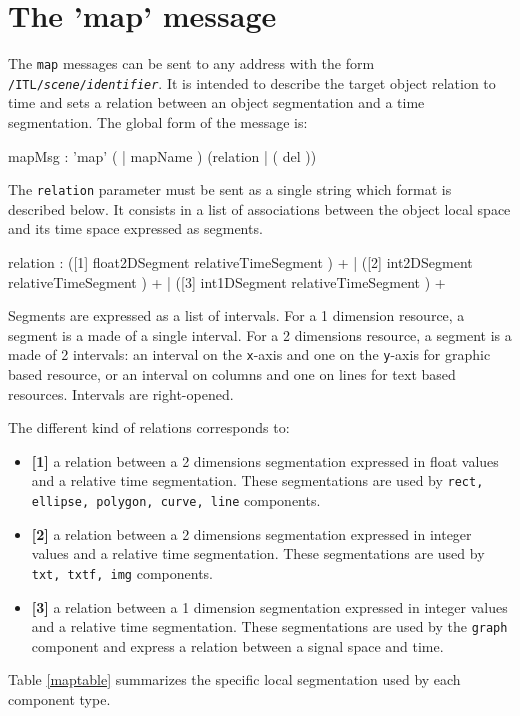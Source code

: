 \documentclass[a4paper,twoside]{report}
\newcommand{\sublevel}[1]	{\section{#1}}
\newcommand{\OSC}[1]		{\texttt{#1}}
\newcommand{\values}[1]	{\texttt{#1}}
\begin{document}
\sublevel{The 'map' message}
\label{mapMsg}

The \OSC{map} messages can be sent to any address with the form \OSC{/ITL/\textit{scene}/\textit{identifier}}. It is intended to describe the target object relation to time and sets a relation between an object segmentation and a time segmentation. 
The global form of the message is:

\begin{rail}
mapMsg : 'map' ( | mapName ) (relation	|	( del ))
\end{rail}

The \OSC{relation} parameter must be sent as a single string which format is described below. It consists in a list of associations between the object local space and its time space expressed as segments.

\begin{rail}
relation : 
		([1] float2DSegment relativeTimeSegment ) +
	| 	([2] int2DSegment relativeTimeSegment ) +
	| 	([3] int1DSegment relativeTimeSegment ) + 
\end{rail}

Segments are expressed as a list of intervals. For a 1 dimension resource, a segment is a made of a single interval. For a 2 dimensions resource, a segment is a made of 2 intervals: an interval on the \values{x}-axis and one on the \values{y}-axis for graphic based resource, or an interval on columns and one on lines for text based resources. Intervals are right-opened.

The different kind of relations corresponds to:
\begin{itemize}
\item \textbf{[1]} a relation between a 2 dimensions segmentation expressed in float values and a relative time segmentation. These segmentations are used by \OSC{rect, ellipse, polygon, curve, line} components.
\item \textbf{[2]} a relation between a 2 dimensions segmentation expressed in integer values and a relative time segmentation. These segmentations are used by \OSC{txt, txtf, img} components. 
\item \textbf{[3]} a relation between a 1 dimension segmentation expressed in integer values and a relative time segmentation. These segmentations are used by the \OSC{graph} component and express a relation between a signal space and time.
\end{itemize}
Table \ref{maptable} summarizes the specific local segmentation used by each component type. 
\end{document}
